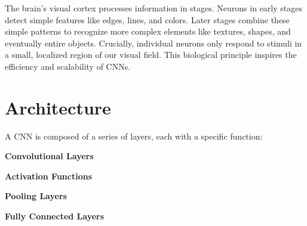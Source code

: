 \begin{infobox}
    The brain’s visual cortex processes information in stages. 
    Neurons in early stages detect simple features like edges, lines, and colors. 
    Later stages combine these simple patterns to recognize more complex elements like textures, shapes, and eventually entire objects. 
    Crucially, individual neurons only respond to stimuli in a small, localized region of our visual field. 
    This biological principle inspires the efficiency and scalability of CNNs.
\end{infobox}
    
\section{Architecture}
 A CNN is composed of a series of layers, each with a specific function:
\begin{compactitemize}
   \item \textbf{Convolutional Layers}
   \item \textbf{Activation Functions}
   \item \textbf{Pooling Layers}
   \item \textbf{Fully Connected Layers}
\end{compactitemize}

